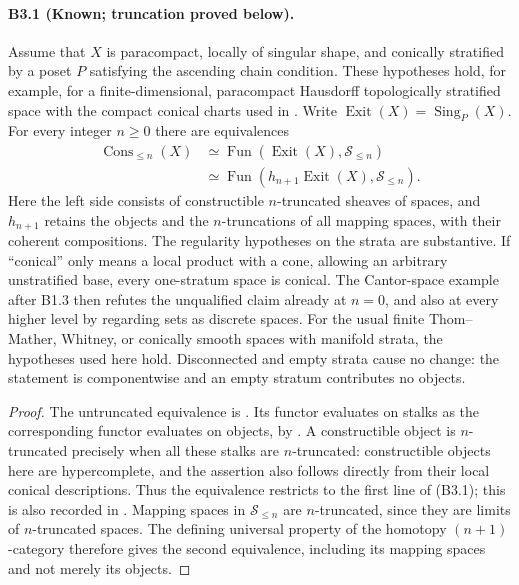\paragraph{B3.1 (Known; truncation proved below).}
Assume that $X$ is paracompact, locally of singular shape, and conically
stratified by a poset $P$ satisfying the ascending chain condition.
These hypotheses hold, for example, for a finite-dimensional,
paracompact Hausdorff topologically stratified space with the compact
conical charts used in \cite[Definition 3.1]{Treumann2009}.
Write $\operatorname{Exit}(X)=\operatorname{Sing}_P(X)$.
For every integer $n\geq0$ there are equivalences
\[
 \begin{split}
 \operatorname{Cons}_{\leq n}(X)
 &\simeq \operatorname{Fun}(\operatorname{Exit}(X),\mathcal S_{\leq n})\\
 &\simeq \operatorname{Fun}(h_{n+1}\operatorname{Exit}(X),
                                      \mathcal S_{\leq n}).
 \end{split}
 \tag{B3.1}
\]
Here the left side consists of constructible $n$-truncated sheaves of
spaces, and $h_{n+1}$ retains the objects and the $n$-truncations of
all mapping spaces, with their coherent compositions.
The regularity hypotheses on the strata are substantive. If
``conical'' only means a local product with a cone, allowing an
arbitrary unstratified base, every one-stratum space is conical.
The Cantor-space example after B1.3 then refutes the unqualified
claim already at $n=0$, and also at every higher level by regarding
sets as discrete spaces. For the usual finite Thom--Mather,
Whitney, or conically smooth spaces with manifold strata, the
hypotheses used here hold. Disconnected and empty strata cause no
change: the statement is componentwise and an empty stratum
contributes no objects.

\begin{proof}
The untruncated equivalence is
\cite[Theorem A.9.3]{LurieHA}. Its functor evaluates on stalks as the
corresponding functor evaluates on objects, by
\cite[Proposition A.9.16]{LurieHA}. A constructible object is
$n$-truncated precisely when all these stalks are $n$-truncated:
constructible objects here are hypercomplete, and the assertion also
follows directly from their local conical descriptions. Thus the
equivalence restricts to the first line of (B3.1); this is also recorded
in \cite[Remark A.9.7]{LurieHA}. Mapping spaces in
$\mathcal S_{\leq n}$ are $n$-truncated, since they are limits of
$n$-truncated spaces. The defining universal property of the homotopy
$(n+1)$-category therefore gives the second equivalence, including its
mapping spaces and not merely its objects.
\end{proof}

